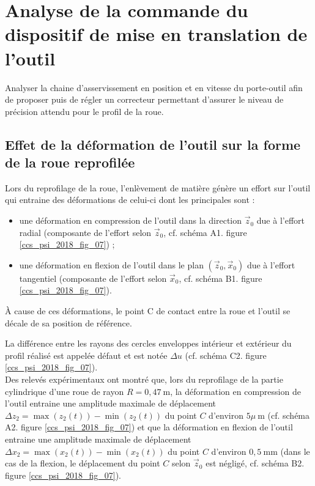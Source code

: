 \section{Analyse de la commande du dispositif de mise en translation de l'outil}
\begin{obj}
Analyser la chaine d'asservissement en position et en vitesse du porte-outil afin de proposer puis de régler un correcteur permettant d'assurer le niveau de précision attendu pour le profil de la roue.
\end{obj}

\subsection{Effet de la déformation de l'outil sur la forme de la roue reprofilée}
Lors du reprofilage de la roue, l'enlèvement de matière génère un effort sur l'outil qui entraine des déformations de celui-ci dont les principales sont :

\begin{itemize}
  \item une déformation en compression de l'outil dans la direction $\vec{z}_{0}$ due à l'effort radial (composante de l'effort selon $\vec{z}_{0}$, cf. schéma A1. figure \ref{ccs_psi_2018_fig_07}) ;
  \item une déformation en flexion de l'outil dans le plan  $\left(\vec{z}_{0}, \vec{x}_{0}\right)$ due à l'effort tangentiel (composante de l'effort selon $\vec{x}_{0}$, cf. schéma B1. figure \ref{ccs_psi_2018_fig_07}).
  \end{itemize}
  
À cause de ces déformations, le point C de contact entre la roue et l'outil se décale de sa position de référence.

La différence entre les rayons des cercles enveloppes intérieur et extérieur du profil réalisé est appelée défaut et est notée $\Delta u$ (cf. schéma C2. figure \ref{ccs_psi_2018_fig_07}).\\
Des relevés expérimentaux ont montré que, lors du reprofilage de la partie cylindrique d'une roue de rayon $R=0,47 \mathrm{~m}$, la déformation en compression de l'outil entraine une amplitude maximale de déplacement $\Delta z_{2}= \max \left(z_{2}(t)\right)-\min \left(z_{2}(t)\right)$ du point $C$ d'environ $5 \mu \mathrm{~m}$ (cf. schéma A2. figure \ref{ccs_psi_2018_fig_07}) et que la déformation en flexion de l'outil entraine une amplitude maximale de déplacement $\Delta x_{2}=\max \left(x_{2}(t)\right)-\min \left(x_{2}(t)\right)$ du point $C$ d'environ $0,5 \mathrm{~mm}$ (dans le cas de la flexion, le déplacement du point $C$ selon $\vec{z}_{0}$ est négligé, cf. schéma B2. figure \ref{ccs_psi_2018_fig_07}).\\

